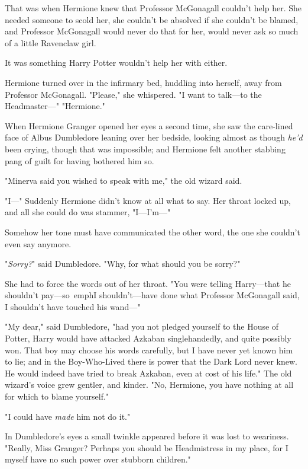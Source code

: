 That was when Hermione knew that Professor McGonagall couldn't help her. She 
needed someone to scold her, she couldn't be absolved if she couldn't be 
blamed, and Professor McGonagall would never do that for her, would never ask 
so much of a little Ravenclaw girl.

It was something Harry Potter wouldn't help her with either.

Hermione turned over in the infirmary bed, huddling into herself, away from 
Professor McGonagall. "Please," she whispered. "I want to talk---to the 
Headmaster---"
\sbreak
"Hermione."

When Hermione Granger opened her eyes a second time, she saw the care-lined 
face of Albus Dumbledore leaning over her bedside, looking almost as though 
\emph{he'd} been crying, though that was impossible; and Hermione felt another 
stabbing pang of guilt for having bothered him so.

"Minerva said you wished to speak with me," the old wizard said.

"I---" Suddenly Hermione didn't know at all what to say. Her throat locked up, 
and all she could do was stammer, "I---I'm---"

Somehow her tone must have communicated the other word, the one she couldn't 
even say anymore.

"\emph{Sorry?}" said Dumbledore. "Why, for what should you be sorry?"

She had to force the words out of her throat. "You were telling Harry---that he 
shouldn't pay---so\ emph{I} shouldn't---have done what Professor McGonagall 
said, I shouldn't have touched his wand---"

"My dear," said Dumbledore, "had you not pledged yourself to the House of 
Potter, Harry would have attacked Azkaban singlehandedly, and quite possibly 
won. That boy may choose his words carefully, but I have never yet known him to 
lie; and in the Boy-Who-Lived there is power that the Dark Lord never knew. He 
would indeed have tried to break Azkaban, even at cost of his life." The old 
wizard's voice grew gentler, and kinder. "No, Hermione, you have nothing at all 
for which to blame yourself."

"I could have \emph{made} him not do it."

In Dumbledore's eyes a small twinkle appeared before it was lost to weariness. 
"Really, Miss Granger? Perhaps you should be Headmistress in my place, for I 
myself have no such power over stubborn children."

